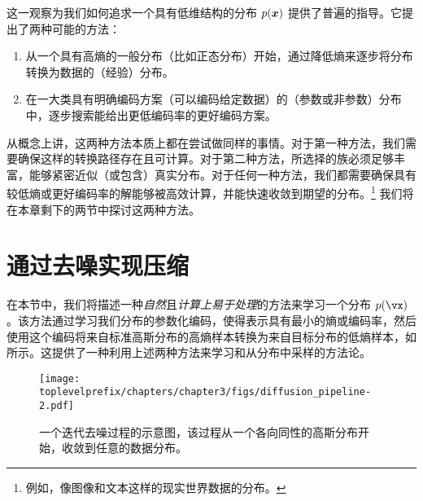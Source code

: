 \documentclass[../../book-main.tex]{subfiles}
\begin{document}
这一观察为我们如何追求一个具有低维结构的分布 $p(\bm{x})$ 提供了普遍的指导。它提出了两种可能的方法：
\begin{enumerate}
	\item 从一个具有高熵的一般分布（比如正态分布）开始，通过降低熵来逐步将分布转换为数据的（经验）分布。
	\item 在一大类具有明确编码方案（可以编码给定数据）的（参数或非参数）分布中，逐步搜索能给出更低编码率的更好编码方案。
\end{enumerate}
从概念上讲，这两种方法本质上都在尝试做同样的事情。对于第一种方法，我们需要确保这样的转换路径存在且可计算。对于第二种方法，所选择的族必须足够丰富，能够紧密近似（或包含）真实分布。对于任何一种方法，我们都需要确保具有较低熵或更好编码率的解能够被高效计算，并能快速收敛到期望的分布。\footnote{例如，像图像和文本这样的现实世界数据的分布。} 我们将在本章剩下的两节中探讨这两种方法。%

\section{通过去噪实现压缩}\label{sub:compression_denoising}

在本节中，我们将描述一种\textit{自然}且\textit{计算上易于处理}的方法来学习一个分布 \(p(\vx)\)。该方法通过学习我们分布的参数化编码，使得表示具有最小的熵或编码率，然后使用这个编码将来自标准高斯分布的高熵样本转换为来自目标分布的低熵样本，如  所示。这提供了一种利用上述两种方法来学习和从分布中采样的方法论。

\begin{figure}[t]
	\centering
	\texttt{[image: \\toplevelprefix/chapters/chapter3/figs/diffusion\_pipeline-2.pdf]}
	\caption{一个迭代去噪过程的示意图，该过程从一个各向同性的高斯分布开始，收敛到任意的数据分布。}
	\label{fig:diffusion-chapter3}
\end{figure}
\end{document}
